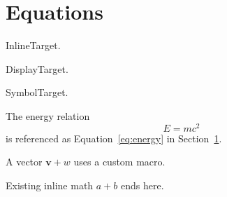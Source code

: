 \documentclass[11pt]{article}
\newcommand{\vect}[1]{\mathbf{#1}}
\begin{document}
\section{Equations}\label{sec:eq}

InlineTarget.

DisplayTarget.

SymbolTarget.

The energy relation
\begin{equation}
  E = m c^2
  \label{eq:energy}
\end{equation}
is referenced as Equation~\eqref{eq:energy} in Section~\ref{sec:eq}.

A vector $\vect{v} + w$ uses a custom macro.

Existing inline math $a + b$ ends here.
\end{document}
